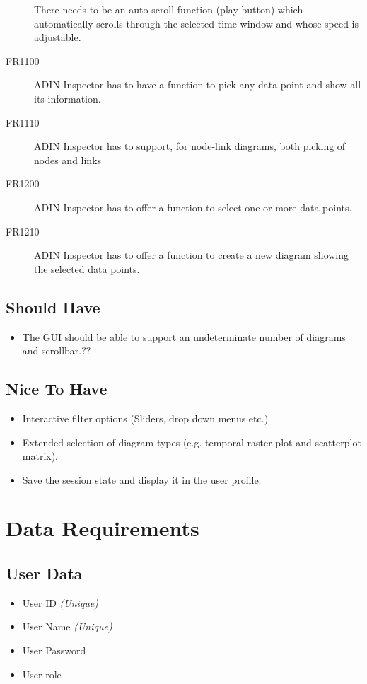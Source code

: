 \documentclass[twoside, english, draft]{Pflichtenheft}
\begin{document}
\begin{description}
	      There needs to be an auto scroll function (play button) which automatically scrolls through the selected time window and whose speed is adjustable.
	\item[FR1100]
	      ADIN Inspector has to have a function to pick any data point and show all its information.
	\item[FR1110]
	      ADIN Inspector has to support, for node-link diagrams, both picking of nodes and links
	\item[FR1200]
	      ADIN Inspector has to offer a function to select one or more data points.
	\item[FR1210]
	      ADIN Inspector has to offer a function to create a new diagram showing the selected data points.

\end{description}

\subsection{Should Have}
\begin{itemize}
	\item{The GUI should be able to support an undeterminate number of diagrams and scrollbar.??}
\end{itemize}
\subsection{Nice To Have}
\begin{itemize}
	\item{Interactive filter options (Sliders, drop down menus etc.)}
	\item{Extended selection of diagram types (e.g. temporal raster plot and scatterplot matrix).}
	\item{Save the session state and display it in the user profile.}

\end{itemize}
\section{Data Requirements}
\subsection{User Data}

\begin{itemize}
	\item User ID \textit{(Unique)}
	\item User Name \textit{(Unique)}
	\item User Password
	\item User \gls{role}
\end{itemize}
\end{document}
